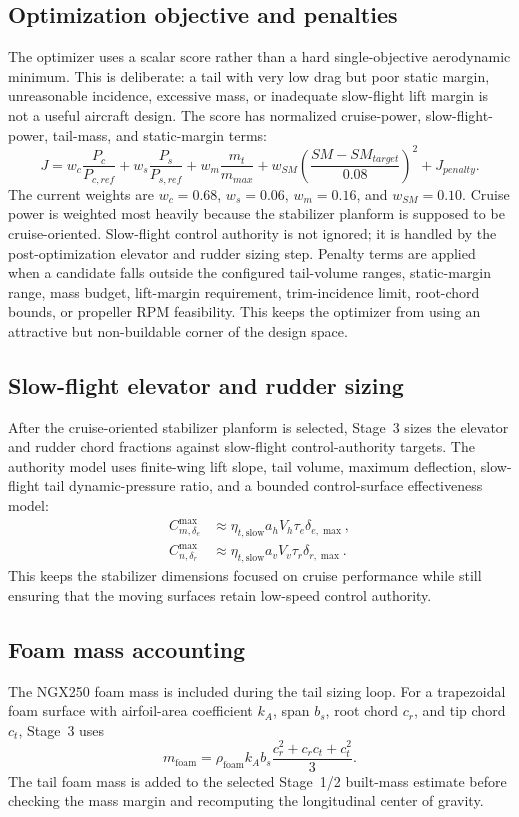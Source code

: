 \documentclass[11pt]{article}
\begin{document}
\subsection{Optimization objective and penalties}
The optimizer uses a scalar score rather than a hard single-objective aerodynamic minimum. This is deliberate: a tail with very low drag but poor static margin, unreasonable incidence, excessive mass, or inadequate slow-flight lift margin is not a useful aircraft design. The score has normalized cruise-power, slow-flight-power, tail-mass, and static-margin terms:
\begin{equation}
J = w_c \frac{P_c}{P_{c,ref}} + w_s \frac{P_s}{P_{s,ref}} + w_m \frac{m_t}{m_{max}} + w_{SM}\left(\frac{SM-SM_{target}}{0.08}\right)^2 + J_{penalty}.
\end{equation}
The current weights are \(w_c=0.68\), \(w_s=0.06\), \(w_m=0.16\), and \(w_{SM}=0.10\). Cruise power is weighted most heavily because the stabilizer planform is supposed to be cruise-oriented. Slow-flight control authority is not ignored; it is handled by the post-optimization elevator and rudder sizing step.
Penalty terms are applied when a candidate falls outside the configured tail-volume ranges, static-margin range, mass budget, lift-margin requirement, trim-incidence limit, root-chord bounds, or propeller RPM feasibility. This keeps the optimizer from using an attractive but non-buildable corner of the design space.

\subsection{Slow-flight elevator and rudder sizing}
After the cruise-oriented stabilizer planform is selected, Stage~3 sizes the elevator and rudder chord fractions against slow-flight control-authority targets. The authority model uses finite-wing lift slope, tail volume, maximum deflection, slow-flight tail dynamic-pressure ratio, and a bounded control-surface effectiveness model:
\begin{align}
C_{m,\delta_e}^{\max} &\approx \eta_{t,\mathrm{slow}} a_h V_h \tau_e \delta_{e,\max}, \\
C_{n,\delta_r}^{\max} &\approx \eta_{t,\mathrm{slow}} a_v V_v \tau_r \delta_{r,\max}.
\end{align}
This keeps the stabilizer dimensions focused on cruise performance while still ensuring that the moving surfaces retain low-speed control authority.

\subsection{Foam mass accounting}
The NGX250 foam mass is included during the tail sizing loop. For a trapezoidal foam surface with airfoil-area coefficient \(k_A\), span \(b_s\), root chord \(c_r\), and tip chord \(c_t\), Stage~3 uses
\begin{equation}
m_{\mathrm{foam}} = \rho_{\mathrm{foam}} k_A b_s \frac{c_r^2 + c_r c_t + c_t^2}{3}.
\end{equation}
The tail foam mass is added to the selected Stage~1/2 built-mass estimate before checking the mass margin and recomputing the longitudinal center of gravity.
\end{document}
